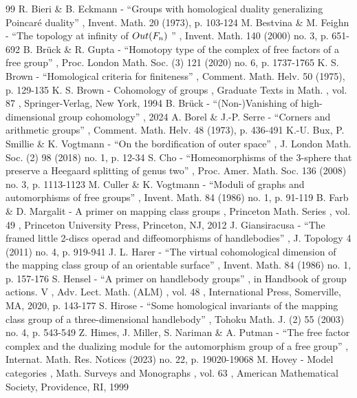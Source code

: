 \documentclass[11pt]{article}
\theoremstyle{plain}
\theoremstyle{definition}
\begin{document}

\begin{thebibliography}{99}
 R. Bieri \& B. Eckmann - “Groups with homological duality generalizing Poincaré duality” , Invent. Math. 20 (1973), p. 103-124
 M. Bestvina \& M. Feighn - “The topology at infinity of ${\rm Out}(F_n)$ ” , Invent. Math. 140 (2000) no. 3, p. 651-692
 B. Brück \& R. Gupta - “Homotopy type of the complex of free factors of a free group” , Proc. London Math. Soc. (3) 121 (2020) no. 6, p. 1737-1765
 K. S. Brown - “Homological criteria for finiteness” , Comment. Math. Helv. 50 (1975), p. 129-135
 K. S. Brown - Cohomology of groups , Graduate Texts in Math. , vol. 87 , Springer-Verlag, New York, 1994
 B. Brück - “(Non-)Vanishing of high-dimensional group cohomology” , 2024
 A. Borel \& J.-P. Serre - “Corners and arithmetic groups” , Comment. Math. Helv. 48 (1973), p. 436-491
 K.-U. Bux, P. Smillie \& K. Vogtmann - “On the bordification of outer space” , J. London Math. Soc. (2) 98 (2018) no. 1, p. 12-34
 S. Cho - “Homeomorphisms of the 3-sphere that preserve a Heegaard splitting of genus two” , Proc. Amer. Math. Soc. 136 (2008) no. 3, p. 1113-1123
 M. Culler \& K. Vogtmann - “Moduli of graphs and automorphisms of free groups” , Invent. Math. 84 (1986) no. 1, p. 91-119
 B. Farb \& D. Margalit - A primer on mapping class groups , Princeton Math. Series , vol. 49 , Princeton University Press, Princeton, NJ, 2012
 J. Giansiracusa - “The framed little 2-discs operad and diffeomorphisms of handlebodies” , J. Topology 4 (2011) no. 4, p. 919-941
 J. L. Harer - “The virtual cohomological dimension of the mapping class group of an orientable surface” , Invent. Math. 84 (1986) no. 1, p. 157-176
 S. Hensel - “A primer on handlebody groups” , in Handbook of group actions. V , Adv. Lect. Math. (ALM) , vol. 48 , International Press, Somerville, MA, 2020, p. 143-177
 S. Hirose - “Some homological invariants of the mapping class group of a three-dimensional handlebody” , Tohoku Math. J. (2) 55 (2003) no. 4, p. 543-549
 Z. Himes, J. Miller, S. Nariman \& A. Putman - “The free factor complex and the dualizing module for the automorphism group of a free group” , Internat. Math. Res. Notices (2023) no. 22, p. 19020-19068
 M. Hovey - Model categories , Math. Surveys and Monographs , vol. 63 , American Mathematical Society, Providence, RI, 1999

\end{thebibliography}
\end{document}
